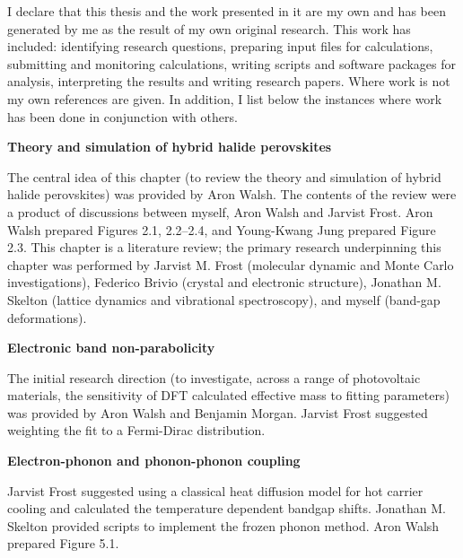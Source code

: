 I declare that this thesis and the work presented in it are my own and has been generated by me as the result of my own original research. This work has included: identifying research questions, preparing input files for calculations, submitting and monitoring calculations, writing scripts and software packages for analysis, interpreting the results and writing research papers. Where work is not my own references are given. In addition, I list below the instances where work has been done in conjunction with others.
\vspace{\frontmatterbaselineskip}

\textbf{Theory and simulation of hybrid halide perovskites } 

The central idea of this chapter (to review the theory and simulation of hybrid halide perovskites) was provided by Aron Walsh. The contents of the review were a product of discussions between myself, Aron Walsh and Jarvist Frost. Aron Walsh prepared Figures 2.1, 2.2--2.4, and Young-Kwang Jung prepared Figure 2.3. This chapter is a literature review; the primary research underpinning this chapter was performed by Jarvist M. Frost (molecular dynamic and Monte Carlo investigations), Federico Brivio (crystal and electronic structure), Jonathan M. Skelton (lattice dynamics and vibrational spectroscopy), and myself (band-gap deformations).

\vspace{\frontmatterbaselineskip}

\textbf{Electronic band non-parabolicity}

The initial research direction (to investigate, across a range of photovoltaic materials, the sensitivity of DFT calculated effective mass to fitting parameters) was provided by Aron Walsh and Benjamin Morgan. Jarvist Frost suggested weighting the fit to a Fermi-Dirac distribution. 

\vspace{\frontmatterbaselineskip}

\textbf{Electron-phonon and phonon-phonon coupling}

Jarvist Frost suggested using a classical heat diffusion model for hot carrier cooling and calculated the temperature dependent bandgap shifts. Jonathan M. Skelton provided scripts to implement the frozen phonon method. Aron Walsh prepared Figure 5.1.


